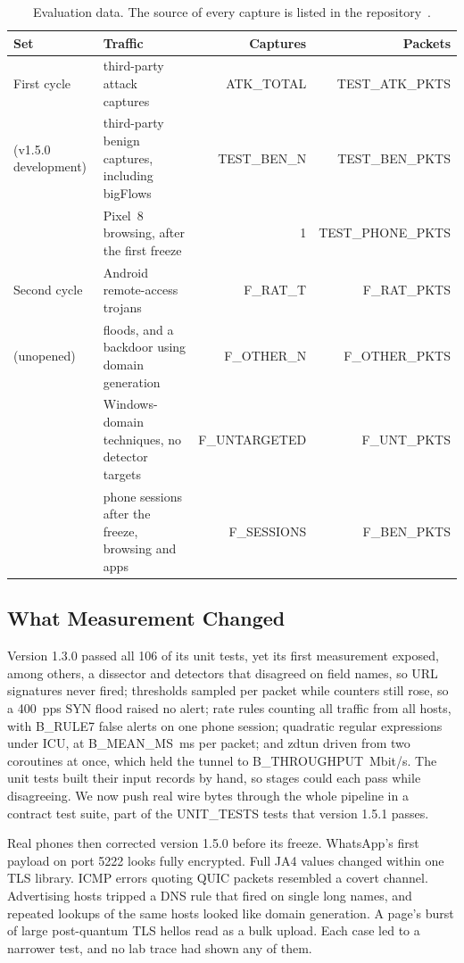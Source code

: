 \documentclass[runningheads]{llncs}
\begin{document}
\begin{table}[t]
\centering
\caption{Evaluation data. The source of every capture is listed in the repository~\cite{repo}.}\label{tab:data}
\begin{tabular}{@{}llrr@{}}
\toprule
Set & Traffic & Captures & Packets \\
\midrule
First cycle & third-party attack captures & {{ATK_TOTAL}} & {{TEST_ATK_PKTS}} \\
(v1.5.0 development) & third-party benign captures, including bigFlows~\cite{tcpreplay} & {{TEST_BEN_N}} & {{TEST_BEN_PKTS}} \\
 & Pixel~8 browsing, after the first freeze & 1 & {{TEST_PHONE_PKTS}} \\
Second cycle & Android remote-access trojans & {{F_RAT_T}} & {{F_RAT_PKTS}} \\
(unopened) & floods, and a backdoor using domain generation & {{F_OTHER_N}} & {{F_OTHER_PKTS}} \\
 & Windows-domain techniques, no detector targets & {{F_UNTARGETED}} & {{F_UNT_PKTS}} \\
 & phone sessions after the freeze, browsing and apps & {{F_SESSIONS}} & {{F_BEN_PKTS}} \\
\bottomrule
\end{tabular}
\end{table}

\subsection{What Measurement Changed}\label{sec:defects}

Version 1.3.0 passed all 106 of its unit tests, yet its first measurement exposed, among others, a dissector and detectors that disagreed on field names, so URL signatures never fired; thresholds sampled per packet while counters still rose, so a 400~pps SYN flood raised no alert; rate rules counting all traffic from all hosts, with {{B_RULE7}} false alerts on one phone session; quadratic regular expressions under ICU, at {{B_MEAN_MS}}~ms per packet; and zdtun driven from two coroutines at once, which held the tunnel to {{B_THROUGHPUT}}~Mbit/s. The unit tests built their input records by hand, so stages could each pass while disagreeing. We now push real wire bytes through the whole pipeline in a contract test suite, part of the {{UNIT_TESTS}} tests that version 1.5.1 passes.

Real phones then corrected version 1.5.0 before its freeze. WhatsApp's first payload on port 5222 looks fully encrypted. Full JA4 values changed within one TLS library. ICMP errors quoting QUIC packets resembled a covert channel. Advertising hosts tripped a DNS rule that fired on single long names, and repeated lookups of the same hosts looked like domain generation. A page's burst of large post-quantum TLS hellos read as a bulk upload. Each case led to a narrower test, and no lab trace had shown any of them.
\end{document}
